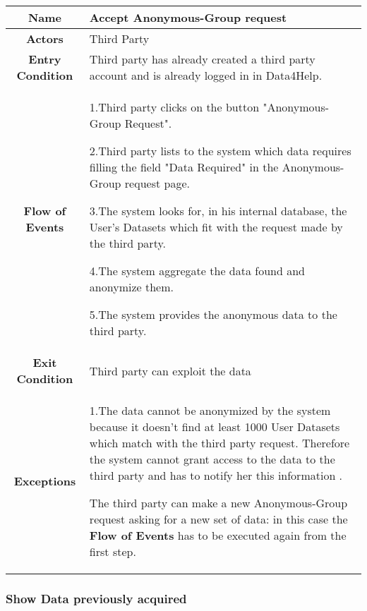       \begin{table}[h!]
        \centering
        \begin{tabularx}{\linewidth}{|c|X|}
          \hline
          \textbf{Name} & Accept Anonymous-Group request\\
        	\hline
        	\textbf{Actors} & Third Party\\
        	\hline
        	\textbf{Entry Condition} & Third party has already created a third party account and is already logged in in Data4Help.\\
        	\hline
        	\textbf{Flow of Events} &
        					1.Third party clicks on the button "Anonymous-Group Request".

        					2.Third party lists to the system which data requires filling the field "Data Required" in the 							Anonymous-Group request page.

        					3.The system looks for, in his internal database, the User's Datasets  which fit with the request 						made by the third party.

        					4.The system aggregate the data found and anonymize them.

        					5.The system provides the anonymous data to the third party.\\
        	\hline
        	\textbf{Exit Condition} & Third party can exploit the data \\

        	\hline
        	\textbf{Exceptions} & 1.The data cannot be anonymized  by the system because it doesn't find at least 1000 							User Datasets which match with the third party request. Therefore the system cannot 							grant access to the data to the third party and has to notify her this information .

        						The third party can make a new Anonymous-Group request asking for a new set of data: 							in this case the \textbf{Flow of Events} has to be executed again from the first step.\\

          \hline
        \end{tabularx}
      \end{table}



    \subsubsection{Show Data previously acquired}

